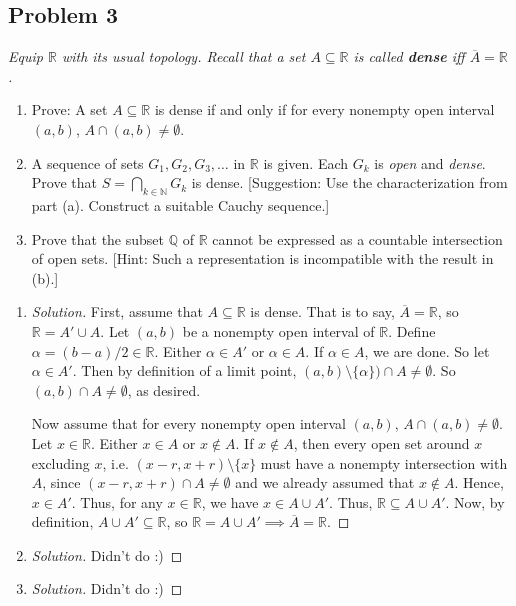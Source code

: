 \documentclass{article}
\newcommand{\N}{{\mathbb N}}
\newcommand{\Q}{{\mathbb Q}}
\newcommand{\R}{{\mathbb R}}
\begin{document}
\subsection*{Problem 3}
{\it Equip $\R$ with its usual topology.
	Recall that a set $A \subseteq \R$ is called \textbf{dense} iff $\overline{A} = \R$.
\begin{enumerate}
	\item Prove: A set $A \subseteq \R$ is dense if and only if
		for every nonempty open interval $(a,b)$, $A \cap (a,b) \neq \emptyset$.
	\item A sequence of sets $G_1,G_2,G_3,\dots$ in $\R$ is given.
		Each $G_k$ is \emph{open} and \emph{dense}.
		Prove that $S = \bigcap_{k\in\N}G_k$ is dense.
		[Suggestion: Use the characterization from part (a).
		Construct a suitable Cauchy sequence.]
	\item Prove that the subset $\Q$ of $\R$ cannot be expressed as a
		countable intersection of open sets.
		[Hint: Such a representation is incompatible with the result in (b).]
\end{enumerate}}

\begin{enumerate}
	\item \begin{proof}[Solution]\let\qed\relax
		First, assume that $A \subseteq \R$ is dense.
		That is to say, $\overline{A} = \R$,
		so $\R = A' \cup A$.
		Let $(a,b)$ be a nonempty open interval of $\R$.
		Define $\alpha = (b-a)/2 \in \R$.
		Either $\alpha \in A'$ or $\alpha \in A$.
		If $\alpha \in A$, we are done.
		So let $\alpha \in A'$.
		Then by definition of a limit point, $(a,b)\setminus\{\alpha\}) \cap A \neq \emptyset$.
		So $(a,b) \cap A \neq \emptyset$, as desired.

		Now assume that for every nonempty open interval $(a,b)$,
		$A \cap (a,b) \neq \emptyset$.
		Let $x \in \R$.
		Either $x \in A$ or $x \not\in A$.
		If $x \not\in A$, then every open set around $x$ excluding $x$,
		i.e. $(x-r,x+r) \setminus \{x\}$ must have a nonempty intersection
		with $A$, since $(x-r,x+r) \cap A \neq \emptyset$
		and we already assumed that $x \not\in A$.
		Hence, $x \in A'$.
		Thus, for any $x \in \R$, we have $x \in A \cup A'$.
		Thus, $\R \subseteq A \cup A'$.
		Now, by definition, $A \cup A' \subseteq \R$,
		so $\R = A \cup A' \implies \overline{A} = \R$.
	\end{proof}
	\item \begin{proof}[Solution]\let\qed\relax
		Didn't do :)
	\end{proof}
	\item \begin{proof}[Solution]\let\qed\relax
		Didn't do :)
	\end{proof}
\end{enumerate}
\clearpage
~\clearpage
\end{document}
